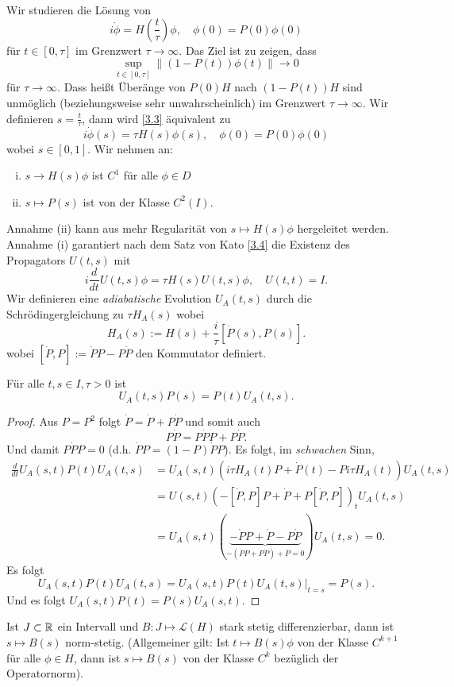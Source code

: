 \documentclass{mycourse}
\begin{document}
Wir studieren die Lösung von
\begin{equation}\label{3.3}
i \dot \phi = H(\frac{t}{\tau}) \phi,\quad \phi(0)= P(0) \phi(0)
\end{equation}
für $t\in [0, \tau]$ im Grenzwert $\tau \to \infty$. Das Ziel ist zu zeigen, dass
\[
\sup_{t\in [0, \tau]} \| (1- P(t)) \phi(t) \| \to 0
\]
für $\tau \to \infty$. Dass heißt Überänge von $P(0) H$ nach $(1- P(t))H$ sind unmöglich (beziehungsweise sehr unwahrscheinlich) im Grenzwert $\tau \to \infty$. Wir definieren $s=\frac{t}{\tau}$, dann wird \eqref{3.3} äquivalent zu
\[
i \dot \phi(s) = \tau H(s) \phi(s), \quad \phi(0)= P(0) \phi(0)
\]
wobei $s\in [0,1]$. Wir nehmen an:
\begin{enumerate}[(i)]
\item $s\to H(s) \phi$ ist $C^1$ für alle $\phi\in D$
\item $s\mapsto P(s)$ ist von der Klasse $C^2(I)$.
\end{enumerate}
Annahme (ii) kann aus mehr Regularität von $s\mapsto H(s) \phi$ hergeleitet werden. Annahme (i) garantiert nach dem Satz von Kato \ref{3.4} die Existenz des Propagators $U(t,s)$ mit
\[
i \frac{d}{dt} U(t,s) \phi= \tau H(s) U(t,s) \phi, \quad U(t,t) = I.
\]
Wir definieren eine \emph{adiabatische} Evolution $U_A(t,s)$ durch die Schrödingergleichung zu $\tau H_A(s)$ wobei
\[
H_A(s):= H(s) + \frac{i}{\tau} [\dot P(s), P(s)].
\]
wobei $[\dot P, P]:= \dot P P - P \dot P$ den Kommutator definiert.
\begin{lem} Für alle $t,s \in I, \tau >0$ ist
\[
U_A(t,s) P(s) = P(t) U_A(t,s).
\]
\end{lem}
\begin{proof}
Aus $P=P^2$ folgt $\dot P=\dot P + P \dot P$ und somit auch
\[
P\dot P = P \dot P P + P \dot P.
\]
Und damit $P\dot P P =0$ (d.h. $\dot P P = (1-P) \dot PP$). Es folgt, im \emph{schwachen} Sinn,
\begin{align*}
\frac{d}{dt} U_A(s,t) P(t) U_A(t,s)&= U_A(s,t) (i \tau H_A(t) P+ \dot P(t)-P i\tau H_A(t))U_A(t,s)\\
&=U(s,t)(-[\dot P, P] P+ \dot P + P [\dot P, P])_t U_A(t,s)\\
&= U_A(s,t) (\underbrace{-\dot P P + \dot P - P \dot P}_{-(\dot P P + P \dot P) + \dot P=0}) U_A(t,s)=0.
\end{align*}
Es folgt
\[
U_A(s,t) P(t) U_A(t,s) = U_A(s,t) P(t) U_A(t,s)\big|_{t=s} = P(s).
\]
Und es folgt $U_A(s,t)P(t)=P(s) U_A(s,t)$.
\end{proof}

\begin{lem}\label{3.6}
Ist $J\subset \mathbb{R}$ ein Intervall und $B: J \mapsto \mathcal L(H)$ stark stetig differenzierbar, dann ist $s\mapsto B(s)$ norm-stetig. (Allgemeiner gilt: Ist $t\mapsto B(s) \phi$ von der Klasse $C^{k+1}$ für alle $\phi \in H$, dann ist $s\mapsto B(s)$ von der Klasse $C^k$ bezüglich der Operatornorm).
\end{lem}
\end{document}
